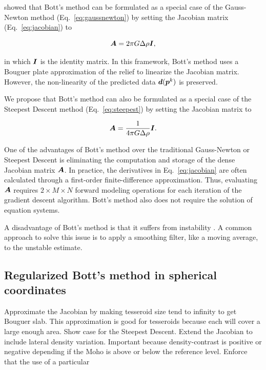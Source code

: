 \documentclass[extra,mreferee]{gji}
\newcommand{\eq}[1]{Eq.~\ref{eq:#1}}
\newcommand{\mbf}[1]{\hbox{\mathversion{bold}$#1$}}
\begin{document}
\citet{silva_fast_2014} showed that Bott's method can be formulated as
a special case of the Gauss-Newton method (\eq{gaussnewton})
by setting the Jacobian matrix (\eq{jacobian}) to

\begin{equation}
    \mbf{A} = 2\pi G \Delta \rho \mbf{I},
    \label{eq:bott-jacobian}
\end{equation}

\noindent
in which $\mbf{I}$ is the identity matrix.
In this framework,
Bott's method uses a Bouguer plate approximation of the relief to
linearize the Jacobian matrix.
However, the non-linearity of the predicted data $\mbf{d}(\mbf{p}^k)$ is
preserved.

We propose that Bott's method can also be formulated as a special case of the
Steepest Descent method (\eq{steepest}) by setting the Jacobian matrix to

\begin{equation}
    \mbf{A} = \dfrac{1}{4 \pi G \Delta \rho}\mbf{I}.
    \label{eq:bott-steepest}
\end{equation}

One of the advantages of Bott's method over the traditional Gauss-Newton or
Steepest Descent is eliminating the computation and storage of the dense
Jacobian matrix $\mbf{A}$.
In practice, the derivatives in \eq{jacobian} are often calculated through a
first-order finite-difference approximation.
Thus, evaluating $\mbf{A}$ requires $2\times M \times N$ forward modeling
operations for each iteration of the gradient descent algorithm.
Bott's method also does not require the solution of equation systems.

A disadvantage of Bott's method is that it suffers from instability
\citep{silva_fast_2014}.
A common approach to solve this issue is to apply a smoothing filter, like a
moving average, to the unstable estimate.


\subsection{Regularized Bott's method in spherical coordinates}

Approximate the Jacobian by making tesseroid size tend to infinity to get
Bouguer slab.
This approximation is good for tesseroids because each will cover a large
enough area.
Show case for the Steepest Descent.
Extend the Jacobian to include lateral density variation.
Important because density-contrast is positive or negative depending if the
Moho is above or below the reference level.
Enforce that the use of a particular
\end{document}
